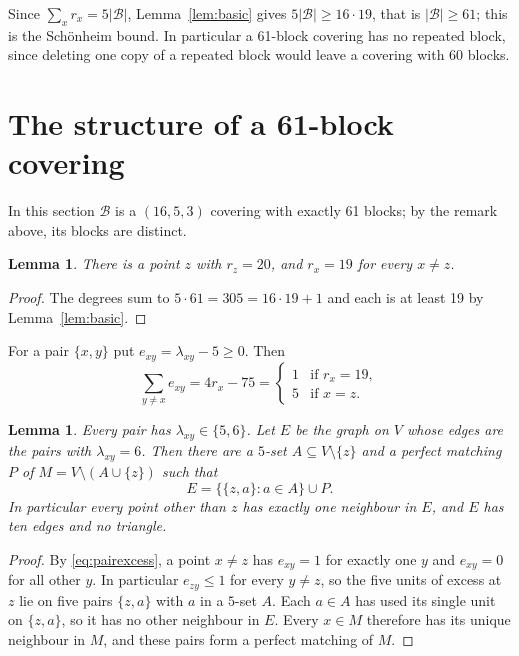 \documentclass[11pt]{amsart}
\newtheorem{lemma}[theorem]{Lemma}
\theoremstyle{definition}
\theoremstyle{remark}
\newcommand{\cB}{\mathcal{B}}
\begin{document}
Since $\sum_x r_x=5|\cB|$, Lemma~\ref{lem:basic} gives $5|\cB|\ge 16\cdot 19$,
that is $|\cB|\ge 61$; this is the Sch\"onheim bound. In particular a 61-block
covering has no repeated block, since deleting one copy of a repeated block
would leave a covering with 60 blocks.

\section{The structure of a 61-block covering}\label{sec:structure}

In this section $\cB$ is a $(16,5,3)$ covering with exactly 61 blocks; by the
remark above, its blocks are distinct.

\begin{lemma}\label{lem:degrees}
There is a point $z$ with $r_z=20$, and $r_x=19$ for every $x\ne z$.
\end{lemma}

\begin{proof}
The degrees sum to $5\cdot 61=305=16\cdot 19+1$ and each is at least 19 by
Lemma~\ref{lem:basic}.
\end{proof}

For a pair $\{x,y\}$ put $e_{xy}=\lambda_{xy}-5\ge 0$. Then
\begin{equation}\label{eq:pairexcess}
\sum_{y\ne x} e_{xy}=4r_x-75=
\begin{cases} 1 & \text{if } r_x=19,\\ 5 & \text{if } x=z.\end{cases}
\end{equation}

\begin{lemma}\label{lem:pairs}
Every pair has $\lambda_{xy}\in\{5,6\}$. Let $E$ be the graph on $V$ whose
edges are the pairs with $\lambda_{xy}=6$. Then there are a $5$-set
$A\subseteq V\setminus\{z\}$ and a perfect matching $P$ of
$M=V\setminus(A\cup\{z\})$ such that
\[
E=\bigl\{\{z,a\}:a\in A\bigr\}\cup P .
\]
In particular every point other than $z$ has exactly one neighbour in $E$, and
$E$ has ten edges and no triangle.
\end{lemma}

\begin{proof}
By \eqref{eq:pairexcess}, a point $x\neq z$ has $e_{xy}=1$ for exactly one $y$
and $e_{xy}=0$ for all other $y$. In particular $e_{zy}\le 1$ for every
$y\ne z$, so the five units of excess at $z$ lie on five pairs $\{z,a\}$ with
$a$ in a $5$-set $A$. Each $a\in A$ has used its single unit on $\{z,a\}$, so
it has no other neighbour in $E$. Every $x\in M$ therefore has its unique
neighbour in $M$, and these pairs form a perfect matching of $M$.
\end{proof}
\end{document}
